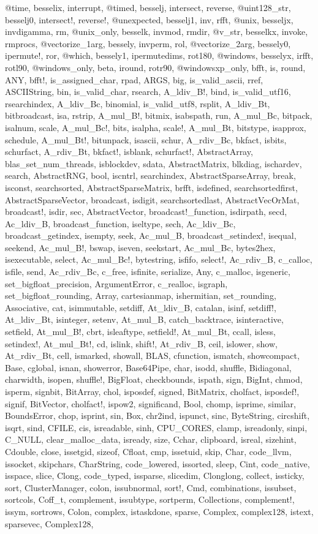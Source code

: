 @time, besselix, interrupt, @timed, besselj, intersect, reverse, @uint128_str, besselj0, intersect!, reverse!, @unexpected, besselj1, inv, rfft, @unix, besseljx, invdigamma, rm, @unix_only, besselk, invmod, rmdir, @v_str, besselkx, invoke, rmprocs, @vectorize_1arg, bessely, invperm, rol, @vectorize_2arg, bessely0, ipermute!, ror, @which, bessely1, ipermutedims, rot180, @windows, besselyx, irfft, rotl90, @windows_only, beta, iround, rotr90, @windowsxp_only, bfft, is, round, ANY, bfft!, is_assigned_char, rpad, ARGS, big, is_valid_ascii, rref, ASCIIString, bin, is_valid_char, rsearch, A_ldiv_B!, bind, is_valid_utf16, rsearchindex, A_ldiv_Bc, binomial, is_valid_utf8, rsplit, A_ldiv_Bt, bitbroadcast, isa, rstrip, A_mul_B!, bitmix, isabspath, run, A_mul_Bc, bitpack, isalnum, scale, A_mul_Bc!, bits, isalpha, scale!, A_mul_Bt, bitstype, isapprox, schedule, A_mul_Bt!, bitunpack, isascii, schur, A_rdiv_Bc, bkfact, isbits, schurfact, A_rdiv_Bt, bkfact!, isblank, schurfact!, AbstractArray, blas_set_num_threads, isblockdev, sdata, AbstractMatrix, blkdiag, ischardev, search, AbstractRNG, bool, iscntrl, searchindex, AbstractSparseArray, break, isconst, searchsorted, AbstractSparseMatrix, brfft, isdefined, searchsortedfirst, AbstractSparseVector, broadcast, isdigit, searchsortedlast, AbstractVecOrMat, broadcast!, isdir, sec, AbstractVector, broadcast!_function, isdirpath, secd, Ac_ldiv_B, broadcast_function, iseltype, sech, Ac_ldiv_Bc, broadcast_getindex, isempty, seek, Ac_mul_B, broadcast_setindex!, isequal, seekend, Ac_mul_B!, bswap, iseven, seekstart, Ac_mul_Bc, bytes2hex, isexecutable, select, Ac_mul_Bc!, bytestring, isfifo, select!, Ac_rdiv_B, c_calloc, isfile, send, Ac_rdiv_Bc, c_free, isfinite, serialize, Any, c_malloc, isgeneric, set_bigfloat_precision, ArgumentError, c_realloc, isgraph, set_bigfloat_rounding, Array, cartesianmap, ishermitian, set_rounding, Associative, cat, isimmutable, setdiff, At_ldiv_B, catalan, isinf, setdiff!, At_ldiv_Bt, isinteger, setenv, At_mul_B, catch_backtrace, isinteractive, setfield, At_mul_B!, cbrt, isleaftype, setfield!, At_mul_Bt, ccall, isless, setindex!, At_mul_Bt!, cd, islink, shift!, At_rdiv_B, ceil, islower, show, At_rdiv_Bt, cell, ismarked, showall, BLAS, cfunction, ismatch, showcompact, Base, cglobal, isnan, showerror, Base64Pipe, char, isodd, shuffle, Bidiagonal, charwidth, isopen, shuffle!, BigFloat, checkbounds, ispath, sign, BigInt, chmod, isperm, signbit, BitArray, chol, isposdef, signed, BitMatrix, cholfact, isposdef!, signif, BitVector, cholfact!, ispow2, significand, Bool, chomp, isprime, similar, BoundsError, chop, isprint, sin, Box, chr2ind, ispunct, sinc, ByteString, circshift, isqrt, sind, CFILE, cis, isreadable, sinh, CPU_CORES, clamp, isreadonly, sinpi, C_NULL, clear_malloc_data, isready, size, Cchar, clipboard, isreal, sizehint, Cdouble, close, issetgid, sizeof, Cfloat, cmp, issetuid, skip, Char, code_llvm, issocket, skipchars, CharString, code_lowered, issorted, sleep, Cint, code_native, isspace, slice, Clong, code_typed, issparse, slicedim, Clonglong, collect, issticky, sort, ClusterManager, colon, issubnormal, sort!, Cmd, combinations, issubset, sortcols, Coff_t, complement, issubtype, sortperm, Collections, complement!, issym, sortrows, Colon, complex, istaskdone, sparse, Complex, complex128, istext, sparsevec, Complex128, 